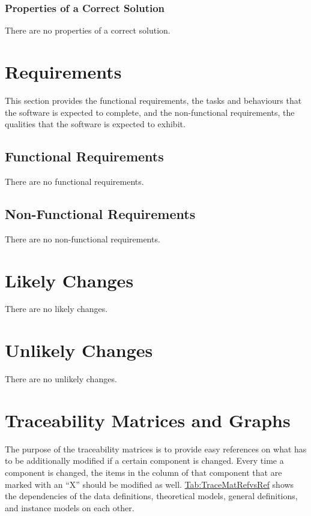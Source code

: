 \documentclass[12pt]{article}
\begin{document}
\subsubsection{Properties of a Correct Solution}
\label{Sec:CorSolProps}
There are no properties of a correct solution.

\section{Requirements}
\label{Sec:Requirements}
This section provides the functional requirements, the tasks and behaviours that the software is expected to complete, and the non-functional requirements, the qualities that the software is expected to exhibit.

\subsection{Functional Requirements}
\label{Sec:FRs}
There are no functional requirements.

\subsection{Non-Functional Requirements}
\label{Sec:NFRs}
There are no non-functional requirements.

\section{Likely Changes}
\label{Sec:LCs}
There are no likely changes.

\section{Unlikely Changes}
\label{Sec:UCs}
There are no unlikely changes.

\section{Traceability Matrices and Graphs}
\label{Sec:TraceMatrices}
The purpose of the traceability matrices is to provide easy references on what has to be additionally modified if a certain component is changed. Every time a component is changed, the items in the column of that component that are marked with an ``X'' should be modified as well. \hyperref[Table:TraceMatRefvsRef]{Tab:TraceMatRefvsRef} shows the dependencies of the data definitions, theoretical models, general definitions, and instance models on each other.
\end{document}
